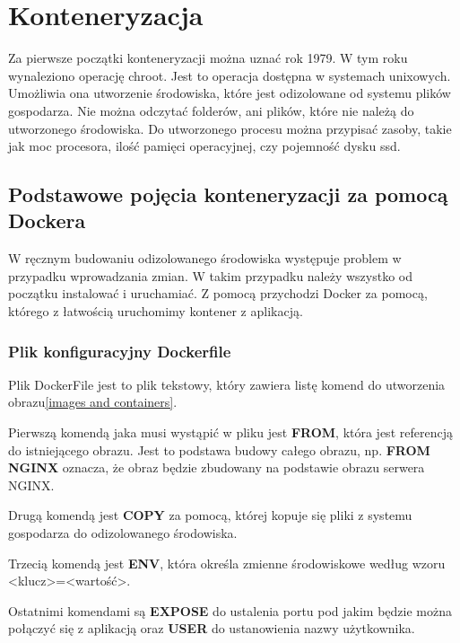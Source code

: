 \documentclass{iiuwb}
\begin{document}
\cleardoublepage
\chapter{Konteneryzacja}
\label{cha:Konteneryzacja}

Za pierwsze początki konteneryzacji można uznać rok 1979. W tym roku wynaleziono operację chroot. Jest to operacja dostępna w systemach unixowych. Umożliwia ona utworzenie środowiska, które jest odizolowane od systemu plików gospodarza. Nie można odczytać folderów, ani plików, które nie należą do utworzonego środowiska. Do utworzonego procesu można przypisać zasoby, takie jak moc procesora, ilość pamięci operacyjnej, czy pojemność dysku ssd.

\section{Podstawowe pojęcia konteneryzacji za pomocą Dockera}

W ręcznym budowaniu odizolowanego środowiska występuje problem w przypadku wprowadzania zmian. W takim przypadku należy wszystko od początku instalować i uruchamiać. Z pomocą przychodzi Docker za pomocą, którego z łatwością uruchomimy kontener z aplikacją. 

\subsection{Plik konfiguracyjny Dockerfile}
\label{sec:dockerfile}

Plik DockerFile jest to plik tekstowy, który zawiera listę komend do utworzenia obrazu\ref{images and containers}.

Pierwszą komendą jaka musi wystąpić w pliku jest \textbf{FROM}, która jest referencją do istniejącego obrazu. Jest to podstawa budowy całego obrazu, np. \textbf{FROM NGINX} oznacza, że obraz będzie zbudowany na podstawie obrazu serwera NGINX.

Drugą komendą jest \textbf{COPY} za pomocą, której kopuje się pliki z systemu gospodarza do odizolowanego środowiska.

Trzecią komendą jest \textbf{ENV}, która określa zmienne środowiskowe według wzoru <klucz>=<wartość>.

Ostatnimi komendami są \textbf{EXPOSE} do ustalenia portu pod jakim będzie można połączyć się z aplikacją oraz \textbf{USER} do ustanowienia nazwy użytkownika.\newline
\end{document}

